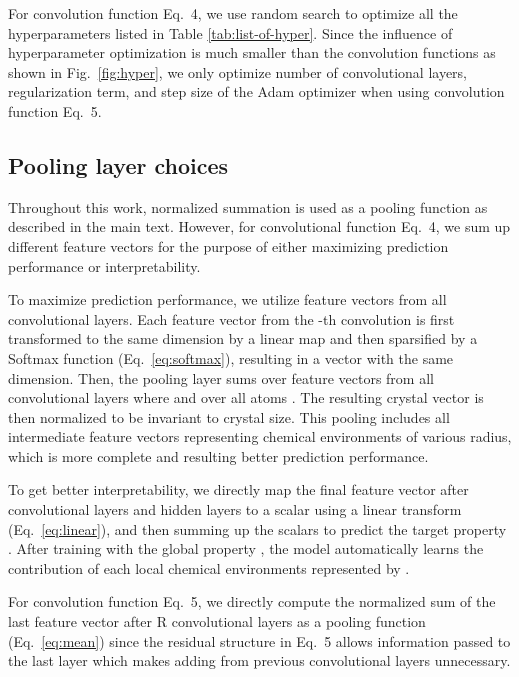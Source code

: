 \documentclass[twocolumn, prl]{revtex4-1}
\begin{document}
For convolution function Eq.~4, we use random search to optimize all the hyperparameters listed in Table \ref{tab:list-of-hyper}. Since the influence of hyperparameter optimization is much smaller than the convolution functions as shown in Fig.~\ref{fig:hyper}, we only optimize number of convolutional layers, regularization term, and step size of the Adam optimizer when using convolution function Eq.~5.

\subsection{Pooling layer choices}
Throughout this work, normalized summation is used as a pooling function as described in the main text. However, for convolutional function Eq.~4, we sum up different feature vectors for the purpose of either maximizing prediction performance or interpretability.

To maximize prediction performance, we utilize feature vectors from all convolutional layers. Each feature vector  from the -th convolution is first transformed to the same dimension by a linear map and then sparsified by a Softmax function (Eq.~\ref{eq:softmax}), resulting in a vector  with the same dimension. Then, the pooling layer sums over feature vectors  from all convolutional layers where  and over all atoms . The resulting crystal vector  is then normalized to be invariant to crystal size. This pooling includes all intermediate feature vectors representing chemical environments of various radius, which is more complete and resulting better prediction performance.









To get better interpretability, we directly map the final feature vector after  convolutional layers and  hidden layers  to a scalar  using a linear transform (Eq.~\ref{eq:linear}), and then summing up the scalars to predict the target property . After training with the global property , the model automatically learns the contribution of each local chemical environments represented by .






For convolution function Eq.~5, we directly compute the normalized sum of the last feature vector  after R convolutional layers as a pooling function (Eq.~\ref{eq:mean}) since the residual structure in Eq.~5 allows information passed to the last layer which makes adding  from previous convolutional layers unnecessary. 
\end{document}
